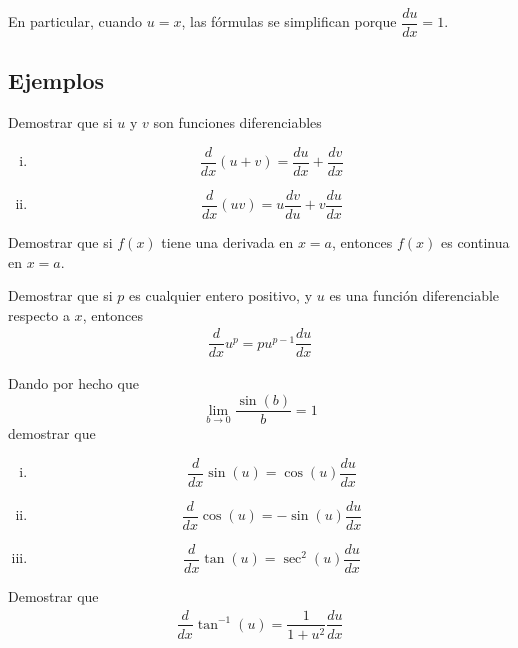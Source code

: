 {}
  En particular, cuando $u=x$, las fórmulas se simplifican porque $\dfrac{du}{dx}=1$.

\subsection{Ejemplos}
{}
  \begin{problema}
   Demostrar que si $u$ y $v$ son funciones diferenciables
   \begin{enumerate}[(i)]
     \item \[\dfrac{d}{dx}\left( u+v \right) = 
     \dfrac{du}{dx}+\dfrac{dv}{dx}\] 
     
     \item \[\dfrac{d}{dx}\left( uv \right) = u\dfrac{dv}{du}+v\dfrac{du}{dx}
     \]
\end{enumerate}
  \end{problema}


{}
  \begin{problema}
   Demostrar que si $f(x)$ tiene una derivada en $x=a$, entonces $f(x)$ es continua en $x=a$.
  \end{problema}


{}
  \begin{problema}
   Demostrar que si $p$ es cualquier entero positivo, y $u$ es una función diferenciable respecto a $x$, entonces
   \begin{align}
    \dfrac{d}{dx}u^{p}=pu^{p-1}\dfrac{du}{dx}
    \end{align}
  \end{problema}


{}
\begin{problema}
   Dando por hecho que \[\lim_{b\to 0}\dfrac{\sin(b)}{b}=1\] demostrar que 
   \begin{enumerate}[(i)]
     \item \[\dfrac{d}{dx}\sin(u)=\cos(u)\dfrac{du}{dx}\] 
     \item \[\dfrac{d}{dx}\cos(u)=-\sin(u)\dfrac{du}{dx}\] 
     \item \[\dfrac{d}{dx}\tan(u)=\sec^{2}(u)\dfrac{du}{dx}\] 
     
\end{enumerate}
\end{problema}


{}
\begin{problema}
 
  Demostrar que 
  \begin{align}
   \dfrac{d}{dx}\tan^{-1}\left( u \right) = 
   \dfrac{1}{1+u^{2}}\dfrac{du}{dx}
   \end{align}
\end{problema}


